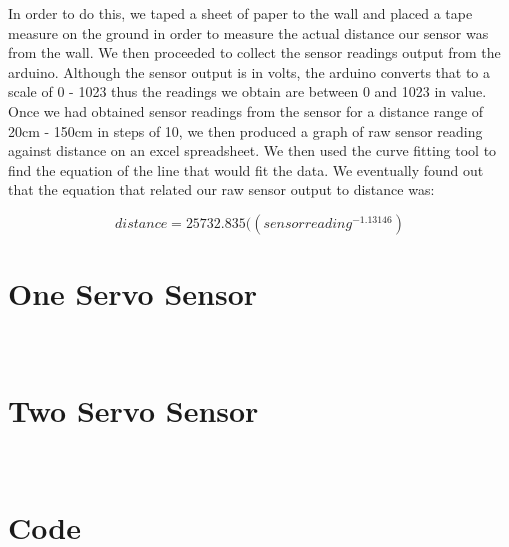 \documentclass{article}
\begin{document}
In order to do this, we taped a sheet of paper to the wall and placed a tape measure on the ground in order to measure the actual distance our sensor was from the wall. We then proceeded to collect the sensor readings output from the arduino. Although the sensor output is in volts, the arduino converts that to a scale of 0 - 1023 thus the readings we obtain are between 0 and 1023 in value. \\

Once we had obtained sensor readings from the sensor for a distance range of 20cm - 150cm in steps of 10, we then produced a graph of raw sensor reading against distance on an excel spreadsheet. We then used the curve fitting tool to find the equation of the line that would fit the data. We eventually found out that the equation that related our raw sensor output to distance was:

\begin{equation}
distance=25732.835((sensor reading^{-1.13146})
\end{equation}

\section{One Servo Sensor} \ \\
\section{Two Servo Sensor} \ \\
\section{Code} \ \\
\end{document}
